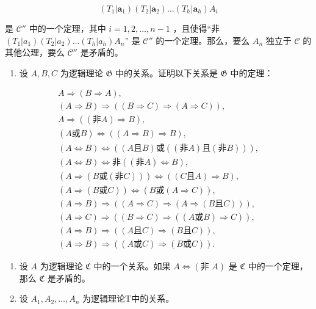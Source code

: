 \[
(T _ {1} | \boldsymbol {a} _ {1}) (T _ {2} | \boldsymbol {a} _ {2}) \dots (T _ {h} | \boldsymbol {a} _ {h}) A _ {i}
\]

是 \(\mathcal{C}''\) 中的一个定理，其中 \(i = 1, 2, \ldots, n - 1\) ，且使得“非 \((T_1|a_1)(T_2|a_2) \ldots (T_h|a_h)A_n\)” 是 \(\mathcal{C}''\) 的一个定理。那么，要么 \(A_n\) 独立于 \(\mathcal{C}\) 的其他公理，要么 \(\mathcal{C}''\) 是矛盾的。

\exercisegroup

\begin{enumerate}
\def\labelenumi{\arabic{enumi}.}
\tightlist
\item
  设 \(A, B, C\) 为逻辑理论 \(\mathfrak{G}\) 中的关系。证明以下关系是 \(\mathfrak{G}\) 中的定理：
\end{enumerate}

\[
\begin{array}{c} A \Longrightarrow (B \Longrightarrow A), \\ (A \Longrightarrow B) \Longrightarrow ((B \Longrightarrow C) \Longrightarrow (A \Longrightarrow C)), \\ A \Longrightarrow ((\text {非} A) \Longrightarrow B), \\ (A \text {或} B) \Longleftrightarrow ((A \Longrightarrow B) \Longrightarrow B), \\ (A \Longleftrightarrow B) \Longleftrightarrow ((A \text {且} B) \text {或} ((\text {非} A) \text {且} (\text {非} B))), \\ (A \Longleftrightarrow B) \Longleftrightarrow \text {非} ((\text {非} A) \Longleftrightarrow B), \\ (A \Longrightarrow (B \text {或} (\text {非} C))) \Longleftrightarrow ((C \text {且} A) \Longrightarrow B), \\ (A \Longrightarrow (B \text {或} C)) \Longleftrightarrow (B \text {或} (A \Longrightarrow C)), \\ (A \Longrightarrow B) \Longrightarrow ((A \Longrightarrow C) \Longrightarrow (A \Longrightarrow (B \text {且} C))), \\ (A \Longrightarrow C) \Longrightarrow ((B \Longrightarrow C) \Longrightarrow ((A \text {或} B) \Longrightarrow C)), \\ (A \Longrightarrow B) \Longrightarrow ((A \text {且} C) \Longrightarrow (B \text {且} C)), \\ (A \Longrightarrow B) \Longrightarrow ((A \text {或} C) \Longrightarrow (B \text {或} C)). \end{array}
\]

\begin{enumerate}
\def\labelenumi{\arabic{enumi}.}
\setcounter{enumi}{1}
\item
  设 \(A\) 为逻辑理论 \(\mathfrak{C}\) 中的一个关系。如果 \(A \Longleftrightarrow (\text{非 } A)\) 是 \(\mathfrak{C}\) 中的一个定理，那么 \(\mathfrak{C}\) 是矛盾的。
\item
  设 \(A_{1}, A_{2}, \ldots, A_{n}\) 为逻辑理论T中的关系。
\end{enumerate}

